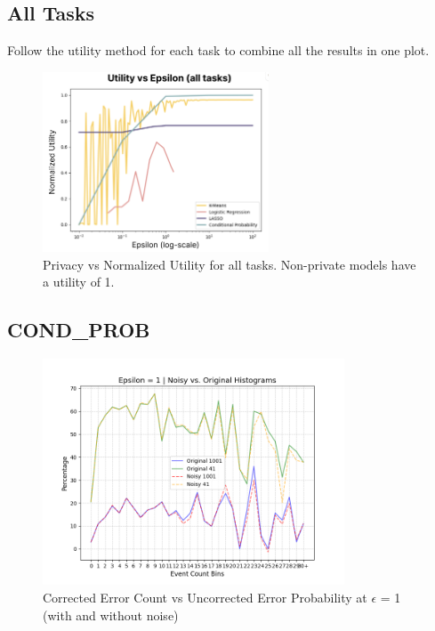 \documentclass[12pt,letterpaper]{article}
\begin{document}
\subsection{All Tasks}

Follow the utility method for each task to combine all the results in one plot. 

\begin{figure}[H]
  \centering
  \includegraphics[width=0.6\textwidth]{figure/meta.png}
  \caption{Privacy vs Normalized Utility for all tasks. Non-private models have a utility of 1.}
  \label{fig:meta}
\end{figure}

\subsection{COND\_PROB}

\begin{figure}[H]
    \centering
    \includegraphics[width=0.8\textwidth]{figure/histoeps1.png}
    \caption{Corrected Error Count vs Uncorrected Error Probability at $\epsilon$ = 1 (with and without noise)}
    \label{fig:histoeps}
\end{figure}
\end{document}
